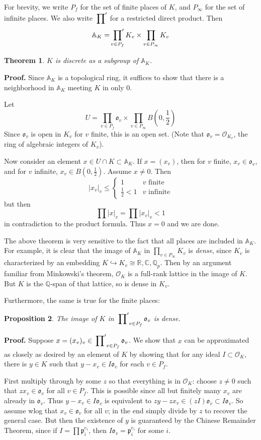 \documentclass[12pt]{article}
\newcommand{\Reals}{\mathbb{R}}
\newcommand{\Complex}{\mathbb{C}}
\newcommand{\Ade}{\mathbb{A}}
\newcommand{\Rats}{\mathbb{Q}}
\newcommand{\Alg}{\mathcal{O}}
\renewcommand{\o}{\mathfrak{o}}
\newcommand{\smp}{\mathfrak{p}}
\newcommand{\Abs}[1]{\left\lvert #1\right\rvert}
\newcommand{\Rprod}{\sideset{}{'}\prod}
\newtheorem{thm}{Theorem}
\newtheorem{prop}[thm]{Proposition}
\begin{document}
For brevity, we write $P_f$ for the set of finite places of $K$, and $P_{\infty}$ for the set of infinite places. We also write $\Rprod$ for a restricted direct product. Then 
\[\Ade_K = \Rprod_{v\in P_f} K_v \times \prod_{v\in P_{\infty}} K_v\]

\begin{thm} $K$ is discrete as a subgroup of $\Ade_K$.
\end{thm}
\textbf{Proof. } Since $\Ade_K$ is a topological ring, it suffices to show that there is a neighborhood in $\Ade_K$ meeting $K$ in only $0$.

Let
\[U=\prod_{v\in P_f} \o_v \times \prod_{v\in P_{\infty}} B\left(0,\frac{1}{2}\right)\]
Since $\o_v$ is open in $K_v$ for $v$ finite, this is an open set. (Note that $\o_v = \Alg_{K_v}$, the ring of algebraic integers of $K_v$).

Now consider an element $x\in U\cap K\subset \Ade_K$. If $x=(x_v)$, then for $v$ finite, $x_v\in \o_v$, and for $v$ infinite, $x_v\in B\left(0,\frac{1}{2}\right)$. Assume $x\neq 0$. Then
\[\Abs{x_v}_v \leq\begin{cases} 1 & v \text{ finite}\\ \frac{1}{2}<1 & v \text{ infinite}\end{cases}\]
but then
\[\prod \Abs{x}_v = \prod \Abs{x_v}_v < 1\]
in contradiction to the product formula. Thus $x=0$ and we are done.


The above theorem is very sensitive to the fact that all places are included in $\Ade_K$. For example, it is clear that the image of $\Ade_K$ in $\prod_{v\in P_{\infty}} K_v$ is \emph{dense}, since $K_v$ is characterized by an embedding $K\hookrightarrow K_v\cong\Reals,\Complex,\Rats_p$. Then by an argument familiar from Minkowski's theorem, $\Alg_K$ is a full-rank lattice in the image of $K$. But $K$ is the $\Rats$-span of that lattice, so is dense in $K_v$.

Furthermore, the same is true for the finite places:
\begin{prop} The image of $K$ in $\Rprod_{v\in P_f} \o_v$ is dense.
\end{prop}
\textbf{Proof. }
Suppose $x=(x_v)_v\in \Rprod_{v\in P_f} \o_v$. We show that $x$ can be approximated as closely as desired by an element of $K$ by showing that for any ideal $I\subset \Alg_K$, there is $y\in K$ such that $y-x_v\in I\o_v$ for each $v\in P_f$.

First multiply through by some $z$ so that everything is in $\Alg_K$: choose $z\neq 0$ such that $zx_v\in\o_v$ for all $v\in P_f$. This is possible since all but finitely many $x_v$ are already in $\o_v$. Thus $y-x_v\in I\o_v$ is equivalent to $zy-zx_v\in(zI)\o_v\subset I\o_v$. So assume wlog that $x_v\in\o_v$ for all $v$; in the end simply divide by $z$ to recover the general case. But then the existence of $y$ is guaranteed by the Chinese Remainder Theorem, since if $I=\prod \smp_i^{e_i}$, then $I\o_v = \smp_i^{e_i}$ for some $i$.
\end{document}
